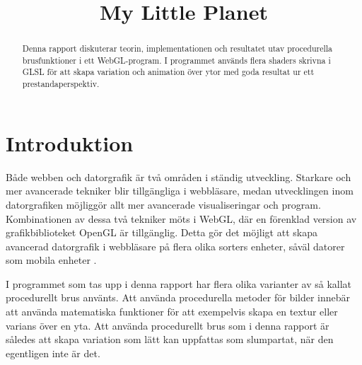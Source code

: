 \documentclass[conference]{IEEEtran}
\begin{document}
%
\title{My Little Planet}

\author{
}

\maketitle

\lstset{language=JavaScript}

\begin{abstract}
Denna rapport diskuterar teorin, implementationen och resultatet utav
procedurella brusfunktioner i ett WebGL-program. I programmet används flera shaders skrivna i GLSL för att skapa variation och animation över ytor med goda resultat ur ett prestandaperspektiv.
\end{abstract}


\section{Introduktion}

Både webben och datorgrafik är två områden i ständig utveckling. Starkare och mer avancerade tekniker blir tillgängliga i webbläsare, medan utvecklingen inom datorgrafiken möjliggör allt mer avancerade visualiseringar och program. Kombinationen av dessa två tekniker möts i WebGL, där en förenklad version av grafikbiblioteket OpenGL är tillgänglig. Detta gör det möjligt att skapa avancerad datorgrafik i webbläsare på flera olika sorters enheter, såväl datorer som mobila enheter \cite{ref:caniuse}.

I programmet som tas upp i denna rapport har flera olika varianter av så kallat procedurellt brus använts. Att använda procedurella metoder för bilder innebär att använda matematiska funktioner för att exempelvis skapa en textur eller varians över en yta. Att använda procedurellt brus som i denna rapport är således att skapa variation som lätt kan uppfattas som slumpartat, när den egentligen inte är det.
\end{document}
